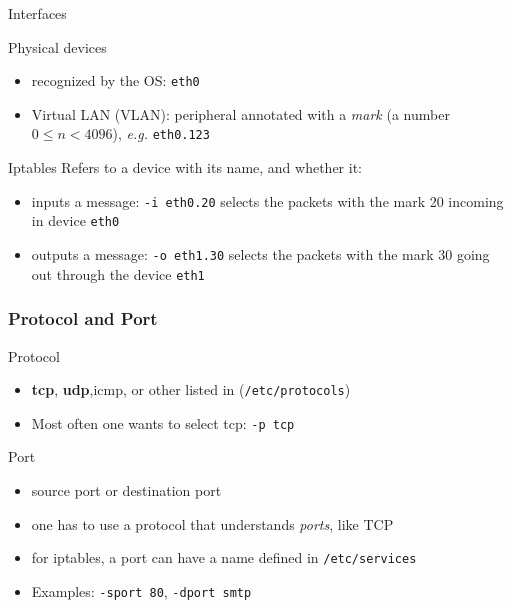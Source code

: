 \begin{reveals}
\begin{frame}[c]{Interfaces}
  \begin{block}{Physical devices}
      \begin{itemize}
      \item recognized by the OS: \texttt{eth0}
      \item Virtual LAN (VLAN): peripheral annotated with a
        \emph{mark} (a number \(0\le n< 4096\)), \textit{e.g.} \texttt{eth0.123}
      \end{itemize}
  \end{block}

  \vfill

  \begin{block}{Iptables}
    Refers to a device with its name, and whether it:
    \begin{itemize}
    \item inputs a message: \texttt{-i eth0.20} selects the packets
      with the mark 20 incoming in device \texttt{eth0}
    \item outputs a message: \texttt{-o eth1.30} selects the packets
      with the mark 30 going out through the device \texttt{eth1}
    \end{itemize}
    
  \end{block}
\end{frame}

\begin{frame}
  \frametitle{Protocol and Port}
  \vfill
  \begin{block}{Protocol}
    \begin{itemize}
    \item \textbf{tcp}, \textbf{udp},icmp, or other listed in
      (\texttt{/etc/protocols})
    \item Most often one wants to select tcp: \texttt{-p tcp}
    \end{itemize}
  \end{block}
  \vfill
  \begin{block}{Port}
    \begin{itemize}
    \item source port or destination port
    \item one has to use a protocol that understands \emph{ports}, like TCP
    \item for iptables, a port can have a name defined in
      \texttt{/etc/services}
    \item Examples: \texttt{-sport 80}, \texttt{-dport smtp}
    \end{itemize}
  \end{block}
  \vfill
\end{frame}



\end{reveals}
